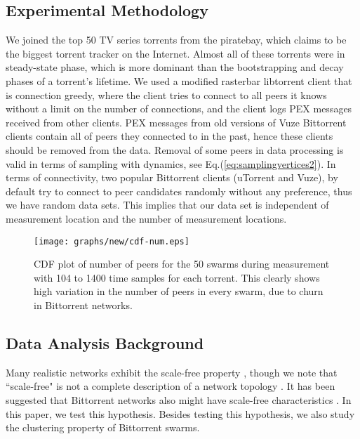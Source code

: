 \documentclass[paper]{ieice}
\begin{document}
\subsection{Experimental Methodology}
We joined the top 50 TV series torrents from the piratebay, which claims to be the biggest torrent tracker on the Internet.
Almost all of these torrents were in steady-state phase, which is more dominant than the bootstrapping and decay phases of a torrent's lifetime.
We used a modified rasterbar libtorrent \cite{rasterbar} client that is connection greedy, where the client tries to connect to all peers it knows without a limit on the number of connections, and the client logs PEX messages received from other clients.
PEX messages from old versions of Vuze Bittorrent clients contain all of peers they connected to in the past, hence these clients should be removed from the data.
Removal of some peers in data processing is valid in terms of sampling with dynamics, see Eq.(\ref{eq:samplingvertices2}).
In terms of connectivity, two popular Bittorrent clients (uTorrent and Vuze), by default try to connect to peer candidates randomly without any preference, thus we have random data sets.
This implies that our data set is independent of measurement location and the number of measurement locations.

\begin{figure}[!t]
\begin{center}
\texttt{[image: graphs/new/cdf-num.eps]}
\end{center}
\caption{CDF plot of number of peers for the 50 swarms during measurement with 104 to 1400 time samples for each torrent. This clearly shows high variation in the number of peers in every swarm, due to churn in Bittorrent networks.} 
\label{fig:num_peers}
\vspace{-6mm}
\end{figure}

\subsection{Data Analysis Background}
Many realistic networks exhibit the scale-free property \cite{clauset2009power}, though we note that ``scale-free" is not a complete description of a network topology \cite{doyle2005robust}\cite{mahadevan2006systematic}. 
It has been suggested that Bittorrent networks also might have scale-free characteristics \cite{dale2008evolution}. 
In this paper, we test this hypothesis. 
Besides testing this hypothesis, we also study the clustering property of Bittorrent swarms. 
\end{document}
